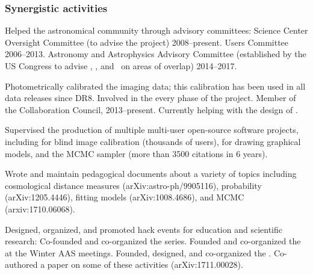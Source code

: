 \documentclass[12pt, fullpage, letterpaper]{article}
\begin{document}
\subsubsection*{Synergistic activities} %
\begin{list}{}{\hogglist}
\item
Helped the astronomical community through advisory committees:
 Science Center Oversight Committee (to advise the  project) 2008--present.
 Users Committee 2006--2013.
Astronomy and Astrophysics Advisory Committee (established by the US
Congress to advise \NSF, \NASA, and \DOE\ on areas of overlap) 2014--2017.
\item
Photometrically calibrated the  imaging data; this
calibration has been used in all data releases since DR8.
Involved in the every phase of the
 project. Member of the
 Collaboration Council,
2013--present. Currently helping with the design of .
\item
Supervised the production of multiple multi-user open-source software projects,
including  for blind image calibration (thousands of users),
 for drawing graphical models, and the 
MCMC sampler (more than 3500 citations in 6 years).
\item
Wrote and maintain pedagogical documents about a variety of topics including
cosmological distance measures (arXiv:astro-ph/9905116),
probability (arXiv:1205.4446),
fitting models (arXiv:1008.4686), and
MCMC (arxiv:1710.06068).
\item
Designed, organized, and promoted hack events for education and scientific research:
Co-founded and co-organized the  series.
Founded and co-organized the  at the Winter AAS meetings.
Founded, designed, and co-organized the .
Co-authored a paper on some of these activities (arXiv:1711.00028).
\end{list}
\end{document}
